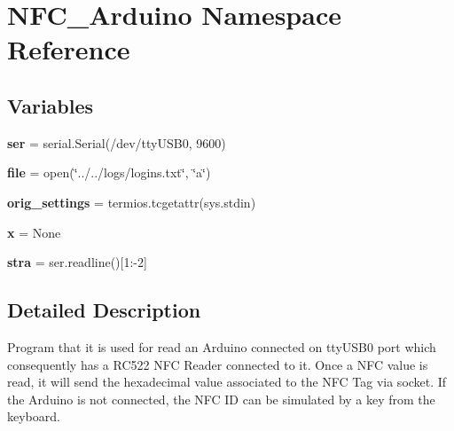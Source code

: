 \hypertarget{namespaceNFC__Arduino}{}\section{N\+F\+C\+\_\+\+Arduino Namespace Reference}
\label{namespaceNFC__Arduino}
\subsection*{Variables}
\begin{DoxyCompactItemize}
\item 
{\bfseries ser} = serial.\+Serial(\textquotesingle{}/dev/tty\+U\+S\+B0\textquotesingle{}, 9600)\hypertarget{namespaceNFC__Arduino_a098df137056dd8f9401fc6ef83860406}{}\label{namespaceNFC__Arduino_a098df137056dd8f9401fc6ef83860406}

\item 
{\bfseries file} = open(\char`\"{}../../logs/logins.\+txt\char`\"{}, \char`\"{}a\char`\"{})\hypertarget{namespaceNFC__Arduino_acb7751cf964ffc03e1d78e06be636342}{}\label{namespaceNFC__Arduino_acb7751cf964ffc03e1d78e06be636342}

\item 
{\bfseries orig\+\_\+settings} = termios.\+tcgetattr(sys.\+stdin)\hypertarget{namespaceNFC__Arduino_afe70bff8432edcf8b18a189291eaff07}{}\label{namespaceNFC__Arduino_afe70bff8432edcf8b18a189291eaff07}

\item 
{\bfseries x} = None\hypertarget{namespaceNFC__Arduino_ae79f4584094541969c8ffe997d8e5a85}{}\label{namespaceNFC__Arduino_ae79f4584094541969c8ffe997d8e5a85}

\item 
{\bfseries stra} = ser.\+readline()\mbox{[}1\+:-\/2\mbox{]}\hypertarget{namespaceNFC__Arduino_a0f727b9d3472b437ae591c225f0bf456}{}\label{namespaceNFC__Arduino_a0f727b9d3472b437ae591c225f0bf456}

\end{DoxyCompactItemize}


\subsection{Detailed Description}
\begin{DoxyVerb}Program that it is used for read an Arduino connected on ttyUSB0 port which consequently has a RC522 NFC Reader connected to it.
Once a NFC value is read, it will send the hexadecimal value associated to the NFC Tag via socket. 
If the Arduino is not connected, the NFC ID can be simulated by a key from the keyboard.
\end{DoxyVerb}
 